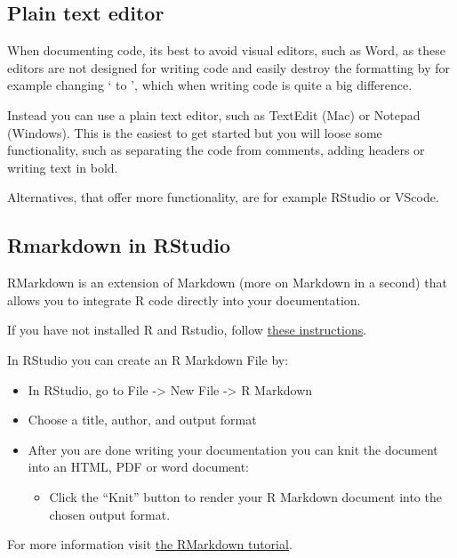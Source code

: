 \documentclass[
  letterpaper,
  DIV=11,
  numbers=noendperiod]{scrreprt}
\providecommand{\tightlist}{%
  \setlength{\itemsep}{0pt}\setlength{\parskip}{0pt}}
\begin{document}
\subsection{Plain text editor}\label{plain-text-editor}

When documenting code, its best to avoid visual editors, such as Word,
as these editors are not designed for writing code and easily destroy
the formatting by for example changing ` to ', which when writing code
is quite a big difference.

Instead you can use a plain text editor, such as TextEdit (Mac) or
Notepad (Windows). This is the easiest to get started but you will loose
some functionality, such as separating the code from comments, adding
headers or writing text in bold.

Alternatives, that offer more functionality, are for example RStudio or
VScode.

\subsection{Rmarkdown in RStudio}\label{rmarkdown-in-rstudio}

RMarkdown is an extension of Markdown (more on Markdown in a second)
that allows you to integrate R code directly into your documentation.

If you have not installed R and Rstudio, follow
\href{https://rstudio-education.github.io/hopr/starting.html}{these
instructions}.

In RStudio you can create an R Markdown File by:

\begin{itemize}
\tightlist
\item
  In RStudio, go to File -\textgreater{} New File -\textgreater{} R
  Markdown
\item
  Choose a title, author, and output format
\item
  After you are done writing your documentation you can knit the
  document into an HTML, PDF or word document:

  \begin{itemize}
  \tightlist
  \item
    Click the ``Knit'' button to render your R Markdown document into
    the chosen output format.
  \end{itemize}
\end{itemize}

For more information visit
\href{https://rmarkdown.rstudio.com/lesson-1.html}{the RMarkdown
tutorial}.
\end{document}
